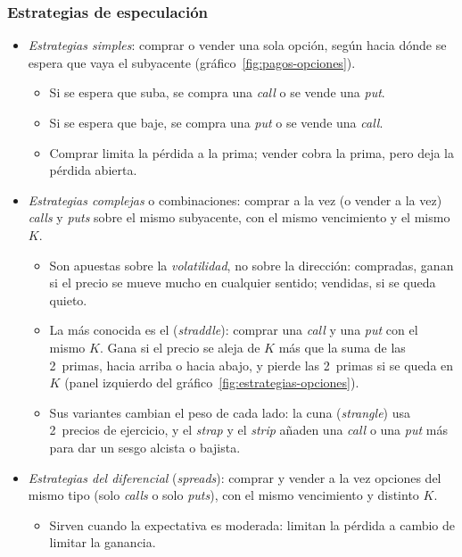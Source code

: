 \documentclass[11pt]{article}
\begin{document}
\subsubsection{Estrategias de especulación}\label{sec:opciones-especulacion}

\begin{itemize}
\item \emph{Estrategias simples}: comprar o vender una sola opción, según hacia dónde se espera que vaya el subyacente (gráfico~\ref{fig:pagos-opciones}).
  \begin{itemize}
  \item Si se espera que suba, se compra una \emph{call} o se vende una \emph{put}.
  \item Si se espera que baje, se compra una \emph{put} o se vende una \emph{call}.
  \item Comprar limita la pérdida a la prima; vender cobra la prima, pero deja la pérdida abierta.
  \end{itemize}
\item \emph{Estrategias complejas} o combinaciones: comprar a la vez (o vender a la vez) \emph{calls} y \emph{puts} sobre el mismo subyacente, con el mismo vencimiento y el mismo $K$.
  \begin{itemize}
  \item Son apuestas sobre la \emph{volatilidad}, no sobre la dirección: compradas, ganan si el precio se mueve mucho en cualquier sentido; vendidas, si se queda quieto.
  \item La más conocida es el  (\emph{straddle}): comprar una \emph{call} y una \emph{put} con el mismo $K$. Gana si el precio se aleja de $K$ más que la suma de las 2~primas, hacia arriba o hacia abajo, y pierde las 2~primas si se queda en $K$ (panel izquierdo del gráfico~\ref{fig:estrategias-opciones}).
  \item Sus variantes cambian el peso de cada lado: la cuna (\emph{strangle}) usa 2~precios de ejercicio, y el \emph{strap} y el \emph{strip} añaden una \emph{call} o una \emph{put} más para dar un sesgo alcista o bajista.
  \end{itemize}
\item \emph{Estrategias del diferencial} (\emph{spreads}): comprar y vender a la vez opciones del mismo tipo (solo \emph{calls} o solo \emph{puts}), con el mismo vencimiento y distinto $K$.
  \begin{itemize}
  \item Sirven cuando la expectativa es moderada: limitan la pérdida a cambio de limitar la ganancia.

\end{itemize}
\end{itemize}
\end{document}
